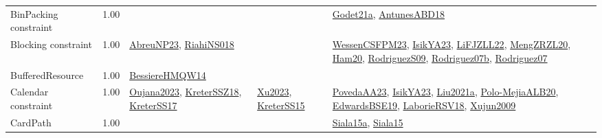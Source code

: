 {\begin{longtable}{p{3cm}r>{\raggedright\arraybackslash}p{6cm}>{\raggedright\arraybackslash}p{6cm}>{\raggedright\arraybackslash}p{8cm}}
\index{BinPacking constraint}\index{Constraints!BinPacking constraint}BinPacking constraint &  1.00 &  &  & \hyperref[detail:Godet21a]{Godet21a}, \hyperref[detail:AntunesABD18]{AntunesABD18}\\
\index{Blocking constraint}\index{Constraints!Blocking constraint}Blocking constraint &  1.00 & \hyperref[detail:AbreuNP23]{AbreuNP23}, \hyperref[detail:RiahiNS018]{RiahiNS018} &  & \hyperref[detail:WessenCSFPM23]{WessenCSFPM23}, \hyperref[detail:IsikYA23]{IsikYA23}, \hyperref[detail:LiFJZLL22]{LiFJZLL22}, \hyperref[detail:MengZRZL20]{MengZRZL20}, \hyperref[detail:Ham20]{Ham20}, \hyperref[detail:RodriguezS09]{RodriguezS09}, \hyperref[detail:Rodriguez07b]{Rodriguez07b}, \hyperref[detail:Rodriguez07]{Rodriguez07}\\
\index{BufferedResource}\index{Constraints!BufferedResource}BufferedResource &  1.00 & \hyperref[detail:BessiereHMQW14]{BessiereHMQW14} &  & \\
\index{Calendar constraint}\index{Constraints!Calendar constraint}Calendar constraint &  1.00 & \hyperref[detail:Oujana2023]{Oujana2023}, \hyperref[detail:KreterSSZ18]{KreterSSZ18}, \hyperref[detail:KreterSS17]{KreterSS17} & \hyperref[detail:Xu2023]{Xu2023}, \hyperref[detail:KreterSS15]{KreterSS15} & \hyperref[detail:PovedaAA23]{PovedaAA23}, \hyperref[detail:IsikYA23]{IsikYA23}, \hyperref[detail:Liu2021a]{Liu2021a}, \hyperref[detail:Polo-MejiaALB20]{Polo-MejiaALB20}, \hyperref[detail:EdwardsBSE19]{EdwardsBSE19}, \hyperref[detail:LaborieRSV18]{LaborieRSV18}, \hyperref[detail:Xujun2009]{Xujun2009}\\
\index{CardPath}\index{Constraints!CardPath}CardPath &  1.00 &  &  & \hyperref[detail:Siala15a]{Siala15a}, \hyperref[detail:Siala15]{Siala15}\\

\end{longtable}}
